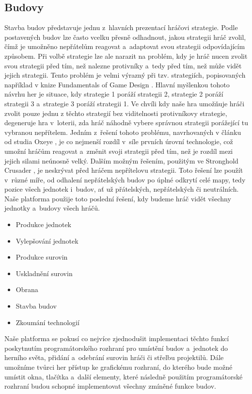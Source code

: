 \subsection{Budovy}
\label{sec:budovy}
Stavba budov představuje jednu z~hlavních prezentací hráčovi strategie. Podle postavených budov lze často vcelku přesně odhadnout, jakou strategii hráč zvolil, čímž je umožněno nepřátelům reagovat a~adaptovat svou strategii odpovídajícím způsobem. 
Při volbě strategie lze ale narazit na problém, kdy je hráč nucen zvolit svou strategii před tím, než nalezne protivníky a~tedy před tím, než může vidět jejich strategii. Tento problém je velmi výrazný při tzv.    strategiích, popisovaných například v knize Fundamentals of Game Design \citep[str.~329]{book:gamefund}. Hlavní myšlenkou tohoto návrhu her je situace, kdy strategie 1 poráží strategii 2, strategie 2 poráží strategii 3 a~strategie 3 poráží strategii 1. Ve chvíli kdy naše hra umožňuje hráči zvolit pouze jednu z těchto strategií bez viditelnosti protivníkovy strategie, degeneruje hra v~loterii, zda hráč náhodně vybere správnou strategii porážející tu vybranou nepřítelem. Jedním z~řešení tohoto problému, navrhovaných v článku od studia Oxeye \citep{site:oxeye03}, je co nejmenší rozdíl v~síle prvních úrovní technologie, což umožní hráčům reagovat a~změnit svoji strategii před tím, než je rozdíl mezi jejich silami neúnosně velký. Dalším možným řešením, použitým ve Stronghold Crusader \citep{site:strongholdcrus}, je neskrývat před hráčem nepřítelovu strategii. Toto řešení lze použít v~různé míře, od odhalení nepřátelských budov po úplné odkrytí celé mapy, tedy pozice všech jednotek i~budov, ať už přátelských, nepřátelských či neutrálních. Naše platforma použije toto poslední řešení, kdy budeme hráč vidět všechny jednotky a~budovy všech hráčů.

\begin{itemize}
	\item Produkce jednotek
	\item Vylepšování jednotek
	\item Produkce surovin
	\item Uskladnění surovin
	\item Obrana
	\item Stavba budov
	\item Zkoumání technologií
\end{itemize}


Naše platforma se pokusí co nejvíce zjednodušit implementaci těchto funkcí poskytnutím programátorského rozhraní pro umístění budov a~jednotek do herního světa, přidání a~odebrání surovin hráči či střelbu projektilů. Dále umožníme tvůrci her přístup ke grafickému rozhraní, do kterého bude možné umístit okna, tlačítka a~další elementy, které následně použitím programátorské rozhraní budou schopné implementovat všechny zmíněné funkce budov.  

